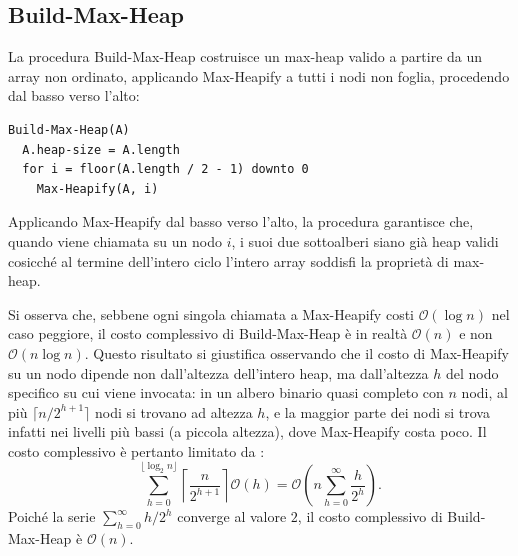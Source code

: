 \subsection{Build-Max-Heap}
La procedura Build-Max-Heap costruisce un max-heap valido a partire da un array non ordinato, applicando Max-Heapify a tutti i nodi non foglia, procedendo dal basso verso l'alto:
\begin{lstlisting}[caption={Build-Max-Heap},label=lst:build-max-heap]
Build-Max-Heap(A)
  A.heap-size = A.length
  for i = floor(A.length / 2 - 1) downto 0
    Max-Heapify(A, i)
\end{lstlisting}
Applicando Max-Heapify dal basso verso l'alto, la procedura garantisce che, quando viene chiamata su un nodo $i$, i suoi due sottoalberi siano già heap validi cosicché al termine dell'intero ciclo l'intero array soddisfi la proprietà di max-heap.

Si osserva che, sebbene ogni singola chiamata a Max-Heapify costi $\mathcal{O}(\log n)$ nel caso peggiore, il costo complessivo di Build-Max-Heap è in realtà $\mathcal{O}(n)$ e non $\mathcal{O}(n \log n)$. Questo risultato si giustifica osservando che il costo di Max-Heapify su un nodo dipende non dall'altezza dell'intero heap, ma dall'altezza $h$ del nodo specifico su cui viene invocata: in un albero binario quasi completo con $n$ nodi, al più $\lceil n/2^{h+1}\rceil$ nodi si trovano ad altezza $h$, e la maggior parte dei nodi si trova infatti nei livelli più bassi (a piccola altezza), dove Max-Heapify costa poco. Il costo complessivo è pertanto limitato da \cite{cormen2022introduction}:
\begin{equation}
  \sum_{h=0}^{\lfloor \log_2 n \rfloor} \left\lceil \frac{n}{2^{h+1}} \right\rceil \mathcal{O}(h) = \mathcal{O}\left(n \sum_{h=0}^{\infty} \frac{h}{2^h}\right).
\end{equation}
Poiché la serie $\sum_{h=0}^{\infty} h/2^h$ converge al valore $2$, il costo complessivo di Build-Max-Heap è $\mathcal{O}(n)$.

